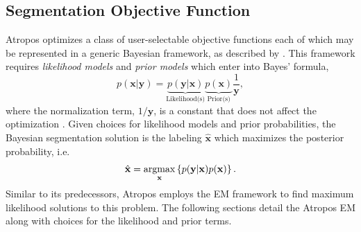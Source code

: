 \documentclass[11pt,english]{article}
\newcommand{\argmax}{\operatornamewithlimits{argmax}}
\begin{document}

\subsection{Segmentation Objective Function}

 Atropos optimizes a class
of user-selectable objective functions each of which may
be represented in a generic Bayesian framework, as described by \cite{Sanjay-Gopal1998}.  This framework
requires {\em likelihood models} and {\em prior models} which enter
into Bayes' formula,
\begin{equation}\label{eq:bayes}
p(\mathbf{x}|\mathbf{y})=\underbrace{
p(\mathbf{y}|\mathbf{x})}_{\text{Likelihood(s)}} \underbrace{
p(\mathbf{x})}_{\text{Prior(s)}}\frac{1}{\mathbf{y}}, 
\end{equation} 
where the normalization term, $1/\mathbf{y}$, is a constant that does
not affect the optimization \citep{Sanjay-Gopal1998}.
Given choices for likelihood models and prior probabilities, the Bayesian
segmentation solution is the labeling $\hat{\mathbf{x}}$ which
maximizes the posterior probability, i.e.
\begin{align} \hat{\mathbf{x}} = \argmax_{\mathbf{x}}
\left\{p(\mathbf{y}|\mathbf{x})p(\mathbf{x})\right\}.
\end{align} Similar to its predecessors, Atropos employs
the EM framework \citep{Dempster1977} to find maximum likelihood
solutions to this problem.  The following sections detail the 
Atropos EM along with choices for the likelihood and prior terms.  
\end{document}

